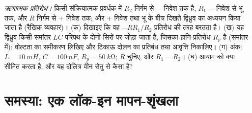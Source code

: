 \begin{exercise}[$\star\star\star$]\label{exo:b2:feedback-oscillators:12}
\emph{ऋणात्मक प्रतिरोध।} किसी संक्रियात्मक प्रवर्धक में $R_2$ निर्गम से $-$
निवेश तक है, $R_1$ $-$ निवेश से भू तक, और $R$ निर्गम से $+$ निवेश तक;
और $+$ निवेश तथा भू के बीच दिखते द्विध्रुव का अध्ययन किया जाता है (रैखिक
व्यवहार)। (क) दिखाइए कि वह $-RR_1/R_2$ प्रतिरोध की तरह बरतता है। (ख) यह
द्विध्रुव किसी समांतर $LC$ परिपथ के दोनों सिरों पर जोड़ा जाता है, जिसका
हानि-प्रतिरोध $R_p$ है (समांतर में): वोल्टता का समीकरण लिखिए और टिकाऊ दोलन का
प्रतिबंध तथा आवृत्ति निकालिए। (ग) अंक: $L
= \qty{10}{mH}$, $C = \qty{100}{nF}$, $R_p = \qty{50}{k\ohm}$; $R$ चुनिए, और $R_1 =
R_2$। (घ) आयाम को क्या सीमित करता है, और यह दोलित्र वीन सेतु से
कैसा है?
\end{exercise}

\section{समस्या: एक लॉक-इन मापन-शृंखला}

